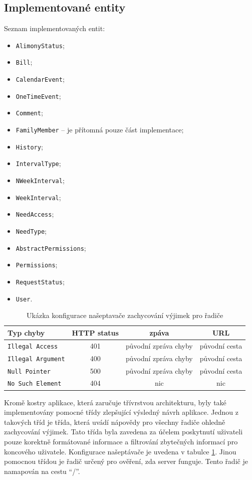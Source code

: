     \subsection{Implementované entity}\label{analyza:implementace:tridy}
        Seznam implementovaných entit:
        \begin{itemize}
            \item \texttt{AlimonyStatus};
            \item \texttt{Bill};
            \item \texttt{CalendarEvent};
            \item \texttt{OneTimeEvent};
            \item \texttt{Comment};
            \item \texttt{FamilyMember} -- je přítomná pouze část implementace;
            \item \texttt{History};
            \item \texttt{IntervalType};
            \item \texttt{NWeekInterval};
            \item \texttt{WeekInterval};
            \item \texttt{NeedAccess};
            \item \texttt{NeedType};
            \item \texttt{AbstractPermissions};
            \item \texttt{Permissions};
            \item \texttt{RequestStatus};
            \item \texttt{User}.
        \end{itemize}
        
        \begin{table}\centering
	    \begin{tabular}{|l|c|c|c|}\hline
		  Typ chyby		& HTTP status		& zpáva	& URL	\tabularnewline \hline \hline
		  \texttt{Illegal Access}	& 401	& původní zpráva chyby		& původní cesta     \tabularnewline \hline
		  \texttt{Illegal Argument}	& 400	& původní zpráva chyby		& původní cesta     \tabularnewline \hline
		  \texttt{Null Pointer}	& 500	& původní zpráva chyby		& původní cesta     \tabularnewline \hline
		  \texttt{No Such Element}	& 404	& nic		& nic     \tabularnewline \hline
	    \end{tabular}\caption[Konfigurace našeptávače pro řadiče]{Ukázka konfigurace našeptavače zachycování výjimek pro řadiče}\label{tab:excpetion-handler1}
        \end{table}
        Kromě kostry aplikace, která zaručuje třívrstvou architekturu, byly také implementovány pomocné třídy zlepšující výsledný návrh aplikace. Jednou z takových tříd je třída, která uvádí nápovědy pro všechny řadiče ohledně zachycování výjimek. Tato třída byla zavedena za účelem poskytnutí uživateli pouze korektně formátované informace a filtrování zbytečných informací pro koncového uživatele. Konfigurace našeptávače je uvedena v tabulce \ref{tab:excpetion-handler1}. Jinou pomocnou třídou je řadič určený pro ověření, zda server funguje. Tento řadič je namapován na cestu \enquote{/}.
        
